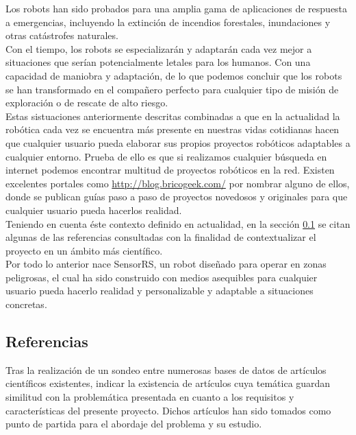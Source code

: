 Los robots han sido probados para una amplia gama de aplicaciones de respuesta a emergencias, incluyendo la extinción de incendios forestales, inundaciones y otras catástrofes
naturales.\\

Con el tiempo, los robots se especializarán y adaptarán cada vez mejor a situaciones que serían potencialmente letales para los humanos. Con una capacidad de maniobra y adaptación,
de lo que podemos concluir que los robots se han transformado en el compañero perfecto para cualquier tipo de misión de exploración o de rescate de alto riesgo.\\

Estas sistuaciones anteriormente descritas combinadas a que en la actualidad la robótica cada vez se encuentra más presente en nuestras vidas cotidianas hacen que cualquier usuario
pueda elaborar sus propios proyectos robóticos adaptables a cualquier entorno. Prueba de ello es que si realizamos cualquier búsqueda en internet podemos encontrar multitud 
de proyectos robóticos en la red. Existen excelentes portales como \url{http://blog.bricogeek.com/} por nombrar alguno de ellos, donde se
publican guías paso a paso de proyectos novedosos y originales para que cualquier usuario pueda hacerlos realidad.\\

Teniendo en cuenta éste contexto definido en actualidad, en la sección \ref{sec:referencias} se citan algunas de las referencias consultadas con la finalidad de contextualizar el proyecto 
en un ámbito más científico.\\

Por todo lo anterior nace SensorRS, un robot diseñado para operar en zonas peligrosas, el cual ha sido construido con medios asequibles para cualquier usuario pueda hacerlo realidad y 
personalizable y adaptable a situaciones concretas.\\

\subsection{ Referencias }
\label{sec:referencias}

Tras la realización de un sondeo entre numerosas bases de datos de artículos científicos existentes, indicar la existencia de artículos cuya temática guardan similitud con la problemática presentada
en cuanto a los requisitos y características del presente proyecto. Dichos artículos han sido tomados como punto de partida para el abordaje del problema y su estudio.\\

